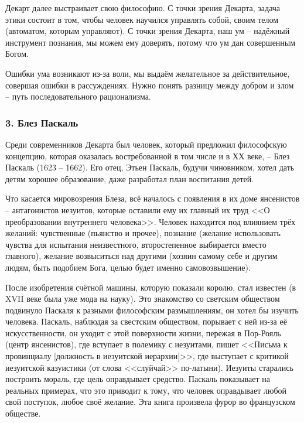 \documentclass[a4paper, 12pt]{book} %
\begin{document}
Декарт далее выстраивает свою философию. С точки зрения Декарта, задача этики состоит в том, чтобы человек научился управлять собой, своим телом (автоматом, которым управляют). С точки зрения Декарта, наш ум -- надёжный инструмент познания, мы можем ему доверять, потому что ум дан совершенным Богом. 

Ошибки ума возникают из-за воли, мы выдаём желательное за действительное, совершая ошибки в рассуждениях. Нужно понять разницу между добром и злом -- путь последовательного рационализма.

\subsubsection*{3. Блез Паскаль}

Среди современников Декарта был человек, который предложил философскую концепцию, которая оказалась востребованной в том числе и в ХХ веке, -- Блез Паскаль (1623 -- 1662). Его отец, Этьен Паскаль, будучи чиновником, хотел дать детям хорошее образование, даже разработал план воспитания детей. 

Что касается мировозрения Блеза, всё началось с появления в их доме янсенистов -- антагонистов иезуитов, которые оставили ему их главный их труд <<О преобразовании внутреннего человека>>. Человек находится под влиянием трёх желаний: чувственные (пьянство и прочее), познание (желание использовать чувства для испытания неизвестного, второстепенное выбирается вместо главного), желание возвыситься над другими (хозяин самому себе и другим людям, быть подобием Бога, целью будет именно самовозвышение).

После изобретения счётной машины, которую показали королю, стал известен (в XVII веке была уже мода на науку). Это знакомство со светским обществом подвинуло Паскаля к разными философским размышлениям, он хотел бы изучить человека. Паскаль, наблюдая за свестским обществом, порывает с ней из-за её искусственности, он уходит с этой поверхности жизни, пережая в Пор-Рояль (центр янсенистов), где вступает в полемику с иезуитами, пишет <<Письма к провинциалу [должность в иезуитской иерархии]>>, где выступает с критикой иезуитской казуистики (от слова <<слуйчай>> по-латыни). Иезуиты старались построить мораль, где цель оправдывает средство. Паскаль показывает на реальных примерах, что это приводит к тому, что человек оправдывает любой свой поступок, любое своё желание. Эта книга произвела фурор во французском обществе. 
\end{document}
